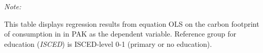 \begin{table}[htbp!]
\begin{adjustbox}{width = 1\textwidth, max height = 0.95\textheight, center}
\begin{threeparttable}[b]
         \begin{tablenotes}\item \medskip \textit{Note:}
            \item This table displays regression results from equation OLS on the carbon footprint of consumption in  in PAK as the dependent variable.  Reference group for education (\textit{ISCED}) is ISCED-level 0-1 (primary or no education).
         \end{tablenotes}
      \end{threeparttable}
   \end{adjustbox}
\end{table}


